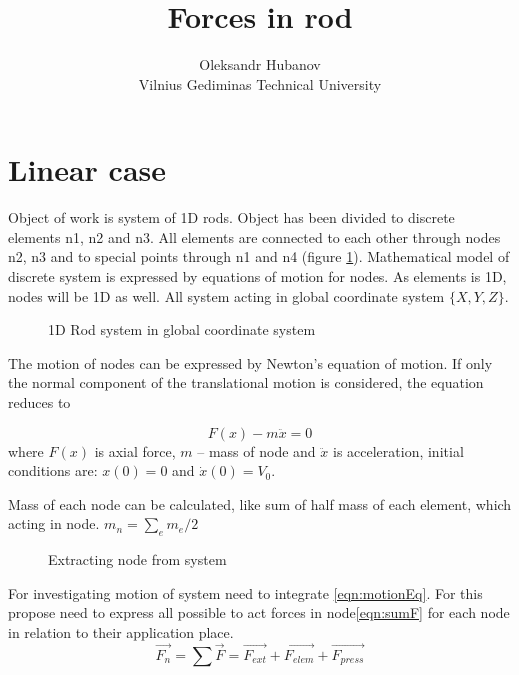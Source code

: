 \documentclass[12pt]{report}
\begin{document}
\title{Forces in rod}
\author{Oleksandr Hubanov\\
Vilnius Gediminas Technical University}
\maketitle
\pagebreak
\section {Linear case}
Object of work is system of 1D rods. Object has been divided to discrete elements n1, n2 and n3.
All elements are connected to each other through nodes n2, n3 and to special points through n1 and n4
(figure \ref{fig:rodSystem}). Mathematical model of discrete system is expressed by equations of motion for nodes.
As elements is 1D, nodes will be 1D as well. All system acting in global coordinate system $\{X, Y, Z\}$.\par
\par
\begin{figure}[ht]\label{fig:rodSystem}
  \centering
      
  \caption{1D Rod system in global coordinate system}      
\end{figure}
The motion of nodes can be expressed by Newton's equation of motion. If only the normal component of the translational
motion is considered, the equation reduces to\par
\begin{equation}\label{eqn:motionEq}
   F(x)-m\ddot{x}=0
\end{equation}
where $F(x)$ is axial force, $m$ – mass of node and $\ddot{x}$ is acceleration, initial conditions are: $x(0)=0$ and
$\dot{x}(0)=V_0$.\par
Mass of each node can be calculated, like sum of half mass of each element, which acting in node.
$m_n=\sum_{e}m_e/2$
\par
\begin{figure}[ht]\label{fig:nodeExtract}
  \centering
      
  \caption{Extracting node from system}    
\end{figure}
For investigating motion of system need to integrate \eqref{eqn:motionEq}. For this propose need to express all possible 
to act forces in node\eqref{eqn:sumF} for each node in relation to their application place. 
\begin{equation}\label{eqn:sumF}
   \overrightarrow{F_n}=\sum\overrightarrow{F}=\overrightarrow{F_{ext}}+\overrightarrow{F_{elem}}+\overrightarrow{F_{press}}
\end{equation}\par
\end{document}
